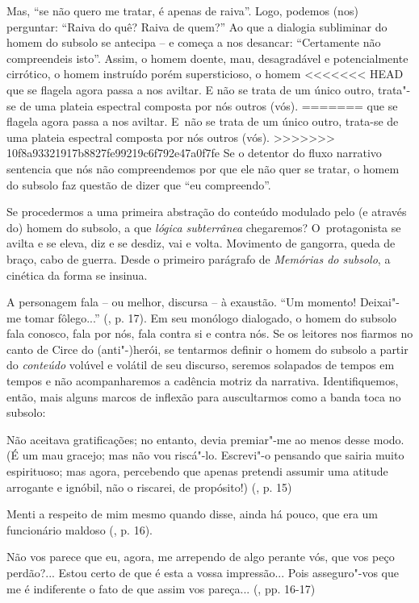 {{Mas, ``se não quero me tratar, é apenas de raiva''. Logo, podemos (nos)
perguntar: ``Raiva do quê? Raiva de quem?'' Ao que a dialogia subliminar
do homem do subsolo se antecipa -- e começa a nos desancar: ``Certamente
não compreendeis isto''. Assim, o homem doente, mau, desagradável e
potencialmente cirrótico, o homem instruído porém supersticioso, o homem
<<<<<<< HEAD
que se flagela agora passa a nos aviltar. E não se trata de um único
outro, trata"-se de uma plateia espectral composta por nós outros (vós).
=======
que se flagela agora passa a nos aviltar. E~não se trata de um único
outro, trata-se de uma plateia espectral composta por nós outros (vós).
>>>>>>> 10f8a93321917b8827fe99219c6f792e47a0f7fe
Se o detentor do fluxo narrativo sentencia que nós não compreendemos por
que ele não quer se tratar, o homem do subsolo faz questão de dizer que
``eu compreendo''.

Se procedermos a uma primeira abstração do conteúdo modulado pelo (e
através do) homem do subsolo, a que \emph{lógica} \emph{subterrânea}
chegaremos? O~protagonista se avilta e se eleva, diz e se desdiz, vai e
volta. Movimento de gangorra, queda de braço, cabo de guerra. Desde o
primeiro parágrafo de \emph{Memórias do subsolo}, a cinética da forma se
insinua.

A personagem fala -- ou melhor, discursa -- à exaustão. ``Um momento!
Deixai"-me tomar fôlego...'' (, p. 17). Em seu monólogo dialogado, o
homem do subsolo fala conosco, fala por nós, fala contra si e contra
nós. Se os leitores nos fiarmos no canto de Circe do (anti"-)herói, se
tentarmos definir o homem do subsolo a partir do \emph{conteúdo} volúvel
e volátil de seu discurso, seremos solapados de tempos em tempos e não
acompanharemos a cadência motriz da narrativa. Identifiquemos, então,
mais alguns marcos de inflexão para auscultarmos como a banda toca no
subsolo:

Não aceitava gratificações; no entanto, devia premiar"-me ao menos desse
modo. (É um mau gracejo; mas não vou riscá"-lo. Escrevi"-o pensando que
sairia muito espirituoso; mas agora, percebendo que apenas pretendi
assumir uma atitude arrogante e ignóbil, não o riscarei, de propósito!)
(, p. 15)

Menti a respeito de mim mesmo quando disse, ainda há pouco, que era um
funcionário maldoso (, p. 16).

Não vos parece que eu, agora, me arrependo de algo perante vós, que vos
peço perdão?... Estou certo de que é esta a vossa impressão... Pois
asseguro"-vos que me é indiferente o fato de que assim vos pareça...
(, pp. 16-17)

}}
